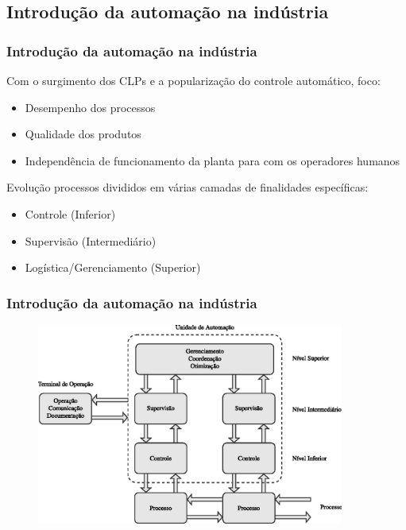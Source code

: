 \documentclass{beamer}
\begin{document}
\subsection{Introdução da automação na indústria}
\begin{frame}
    \frametitle{Introdução da automação na indústria}

    Com o surgimento dos CLPs e a popularização do controle automático, foco:

\begin{itemize}
    \item Desempenho dos processos
    \item Qualidade dos produtos 
    \item Independência de funcionamento da planta para com os operadores
          humanos
\end{itemize}

    Evolução \implica processos divididos em várias camadas de finalidades
    específicas:

\begin{itemize}
    \item Controle (Inferior)
    \item Supervisão (Intermediário)
    \item Logística/Gerenciamento (Superior)
\end{itemize}
    
\end{frame}

\begin{frame}
    \frametitle{Introdução da automação na indústria}

\begin{figure}[htb]
\centering
    \includegraphics[width=0.9\textwidth]{imgs/introducao/eps/esquema_automacao}
\end{figure}
\end{frame}
\end{document}
